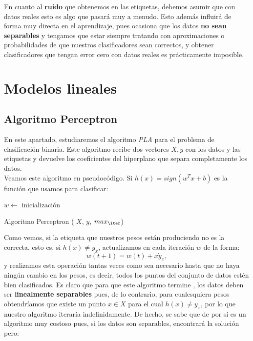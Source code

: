 \documentclass[12pt]{article}
\begin{document}
{En cuanto al \textbf{ruido} que obtenemos en las etiquetas, debemos asumir que con datos reales esto es algo que pasará muy a menudo. Esto además influirá de forma muy directa en el aprendizaje, pues ocasiona que los datos \textbf{no sean separables} y tengamos que estar siempre tratando con aproximaciones o probabilidades de que nuestros clasificadores sean correctos, y obtener clasificadores que tengan error cero con datos reales es prácticamente imposible.


\section*{Modelos lineales}

\subsection*{Algoritmo Perceptron}

En este apartado, estudiaremos el algoritmo \emph{PLA} para el problema de clasificación binaria. Este algoritmo recibe dos vectores $X,y$ con los datos y las etiquetas y devuelve los coeficientes del hiperplano que separa completamente los datos. \\

Veamos este algoritmo en pseudocódigo. Si $h(x) = sign( w^T x + b)$ es la función que usamos para clasificar:


\begin{algorithm}[H]
  \SetAlgoLined

   $w \leftarrow$ inicialización

   \caption{Algoritmo Perceptron ( $X$, $y$, $max_\iter$)}
  \end{algorithm}
  
Como vemos, si la etiqueta que nuestros pesos están produciendo no es la correcta, esto es, si $h(x) \neq y_x$,  actualizamos en cada iteración $w$ de la forma:
$$
w(t+1) = w(t) + x \dot y_x,
$$
y realizamos esta operación tantas veces como sea necesario hasta que no haya ningún cambio en los pesos, es decir, todos los puntos del conjunto de datos estén bien clasificados. Es claro que para que este algoritmo termine , los datos deben ser \textbf{linealmente separables} pues, de lo contrario, para cualesquiera pesos obtendríamos que existe un punto $x \in X$ para el cual $h(x) \neq y_x$, por lo que nuestro algoritmo iteraría indefinidamente. De hecho, se sabe que de por sí es un algoritmo muy costoso pues, si los datos son separables, encontrará la solución pero:

}
\end{document}
